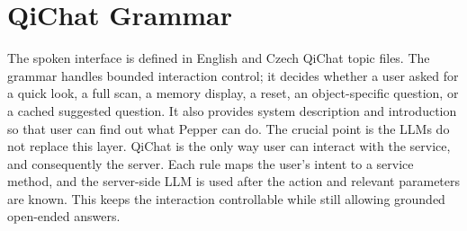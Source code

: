 \section{QiChat Grammar}\label{sec:client-qichat}

The spoken interface is defined in English and Czech QiChat topic files.
The grammar handles bounded interaction control; it decides whether a user asked for a quick look, a full scan, a memory display, a reset, an object-specific question, or a cached suggested question. It also provides system description and introduction so that user can find out what Pepper can do.
The crucial point is the LLMs do not replace this layer. QiChat is the only way user can interact with the service, and consequently the server. Each rule maps the user's intent to a service method, and the server-side LLM is used after the action and relevant parameters are known. This keeps the interaction controllable while still allowing grounded open-ended answers.








